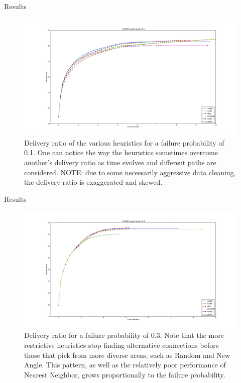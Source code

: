 \documentclass[pdftex]{beamer}
\begin{document}

\begin{frame}{Results}
\begin{figure}
\includegraphics[width=\textwidth]{fprob1}
\vspace{-20pt}
\caption{Delivery ratio of the various heuristics for a failure probability of 0.1.
One can notice the way the heuristics sometimes overcome another's delivery ratio as time evolves and different paths are considered.
NOTE: due to some necessarily aggressive data cleaning, the delivery ratio is exaggerated and skewed.}
\end{figure}
\end{frame}



\begin{frame}{Results}
\begin{figure}
\includegraphics[width=1\textwidth]{fprob3}
\vspace{-20pt}
\caption{Delivery ratio for a failure probability of 0.3.
Note that the more restrictive heuristics stop finding alternative connections before those that pick from more diverse areas, such as Random and New Angle.
This pattern, as well as the relatively poor performance of Nearest Neighbor, grows proportionally to the failure probability.}
\end{figure}
\end{frame}
\end{document}
